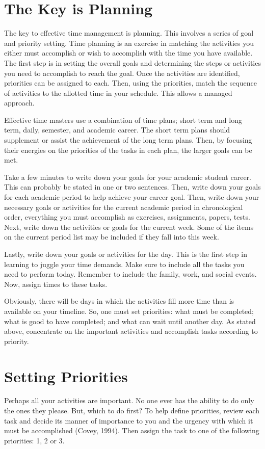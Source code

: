 \documentclass[twocolumn]{article}
\begin{document}
\section*{The Key is Planning}
\noindent
The key to effective time management is planning. This involves a series of goal
and priority setting. Time planning is an exercise in matching the activities
you either must accomplish or wish to accomplish with the time you have available.
The first step is in setting the overall goals and determining the steps or
activities you need to accomplish to reach the goal. Once the activities are
identified, priorities can be assigned to each. Then, using the priorities,
match the sequence of activities to the allotted time in your schedule.
This allows a managed approach.

Effective time masters use a combination of time plans; short term and long term,
daily, semester, and academic career. The short term plans should supplement or
assist the achievement of the long term plans. Then, by focusing their energies
on the priorities of the tasks in each plan, the larger goals can be met.

Take a few minutes to write down your goals for your academic student career.
This can probably be stated in one or two sentences. Then, write down your goals
for each academic period to help achieve your career goal. Then, write down your
necessary goals or activities for the current academic period in chronological
order, everything you must accomplish as exercises, assignments, papers, tests.
Next, write down the activities or goals for the current week. Some of the items
on the current period list may be included if they fall into this week.

Lastly, write down your goals or activities for the day. This is the first step
in learning to juggle your time demands. Make sure to include all the tasks you
need to perform today. Remember to include the family, work, and social events.
Now, assign times to these tasks.

Obviously, there will be days in which the activities fill more time than is
available on your timeline. So, one must set priorities: what must be completed;
what is good to have completed; and what can wait until another day.
As stated above, concentrate on the important activities and accomplish tasks
according to priority.

\section*{Setting Priorities}
\noindent
Perhaps all your activities are important. No one ever has the ability to do only
the ones they please. But, which to do first? To help define priorities, review
each task and decide its manner of importance to you and the urgency with which
it must be accomplished (Covey, 1994). Then assign the task to one of the
following priorities: 1, 2 or 3.
\end{document}

